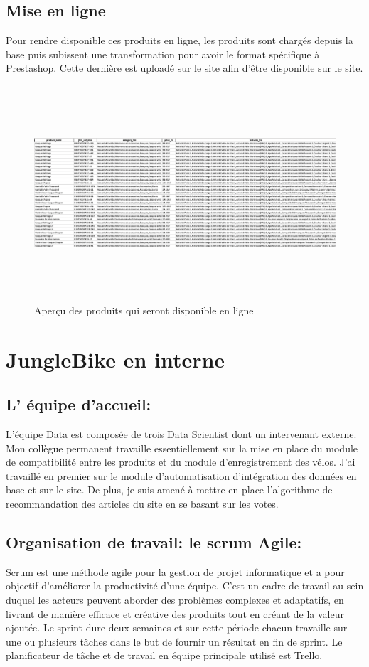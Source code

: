 \subsection{Mise en ligne}
Pour rendre disponible ces produits en ligne, les produits sont chargés depuis la base puis subissent une transformation pour avoir le format spécifique à Prestashop. 
Cette dernière est uploadé sur le site afin d'être disponible sur le site.
\begin{figure}[h]
\begin{center}
\includegraphics[width=15cm,height=8cm]{images/prestashop.png}
\caption[Aperçu des produits qui seront disponible en ligne]{Aperçu des produits qui seront disponible en ligne}
\label{monlabel}
\end{center}
\end{figure}
\newpage
\section{JungleBike en interne}

\subsection{L’ équipe d’accueil:}
L’équipe Data est composée de trois Data Scientist dont un intervenant externe. Mon collègue permanent travaille essentiellement sur la mise en place du module de compatibilité entre les produits et du module d’enregistrement des vélos. J’ai travaillé en premier sur le module d’automatisation d’intégration des données en base et sur le site. De plus, je suis amené à mettre en place l’algorithme de recommandation des articles du site en se basant sur les votes.

\subsection{Organisation de travail: le scrum Agile:}
 Scrum est une méthode agile pour la gestion de projet informatique et a pour objectif d’améliorer la productivité d’une équipe. C’est un cadre de travail au sein duquel les acteurs peuvent aborder des problèmes complexes et adaptatifs, en livrant de manière eﬀicace et créative des produits tout en créant de la valeur ajoutée. Le sprint dure deux semaines et sur cette période chacun travaille sur une ou plusieurs tâches dans le but de fournir un résultat en fin de sprint. Le planificateur de tâche et de travail en équipe principale utilisé est Trello.

